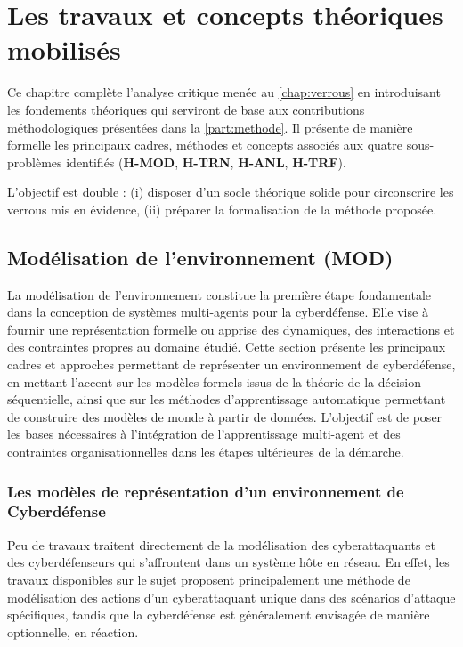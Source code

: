 \clearpage
\thispagestyle{empty}
\null
\newpage

\chapter{Les travaux et concepts théoriques mobilisés}
\label{chap:concepts}

\noindent
Ce chapitre complète l’analyse critique menée au \autoref{chap:verrous} en introduisant
les fondements théoriques qui serviront de base aux contributions méthodologiques
présentées dans la \autoref{part:methode}.
Il présente de manière formelle les principaux cadres, méthodes et concepts
associés aux quatre sous-problèmes identifiés (\textbf{H-MOD}, \textbf{H-TRN}, \textbf{H-ANL}, \textbf{H-TRF}).

L’objectif est double :
(i) disposer d’un socle théorique solide pour circonscrire les verrous mis en évidence,
(ii) préparer la formalisation de la méthode proposée.

\section{Modélisation de l'environnement (MOD)}

\noindent
La modélisation de l'environnement constitue la première étape fondamentale dans la conception de systèmes multi-agents pour la cyberdéfense. Elle vise à fournir une représentation formelle ou apprise des dynamiques, des interactions et des contraintes propres au domaine étudié. Cette section présente les principaux cadres et approches permettant de représenter un environnement de cyberdéfense, en mettant l'accent sur les modèles formels issus de la théorie de la décision séquentielle, ainsi que sur les méthodes d'apprentissage automatique permettant de construire des modèles de monde à partir de données. L'objectif est de poser les bases nécessaires à l'intégration de l'apprentissage multi-agent et des contraintes organisationnelles dans les étapes ultérieures de la démarche.

\subsection{Les modèles de représentation d'un environnement de Cyberdéfense}

Peu de travaux traitent directement de la modélisation des cyberattaquants et des cyberdéfenseurs qui s'affrontent dans un système hôte en réseau. En effet, les travaux disponibles sur le sujet proposent principalement une méthode de modélisation des actions d'un cyberattaquant unique dans des scénarios d'attaque spécifiques, tandis que la cyberdéfense est généralement envisagée de manière optionnelle, en réaction.

